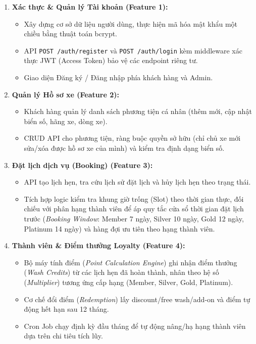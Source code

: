 \begin{enumerate}
    \item \textbf{Xác thực \& Quản lý Tài khoản (Feature 1):}
    \begin{itemize}
        \item Xây dựng cơ sở dữ liệu người dùng, thực hiện mã hóa mật khẩu một chiều bằng thuật toán bcrypt.
        \item API \texttt{POST /auth/register} và \texttt{POST /auth/login} kèm middleware xác thực JWT (Access Token) bảo vệ các endpoint riêng tư.
        \item Giao diện Đăng ký / Đăng nhập phía khách hàng và Admin.
    \end{itemize}

    \item \textbf{Quản lý Hồ sơ xe (Feature 2):}
    \begin{itemize}
        \item Khách hàng quản lý danh sách phương tiện cá nhân (thêm mới, cập nhật biển số, hãng xe, dòng xe).
        \item CRUD API cho phương tiện, ràng buộc quyền sở hữu (chỉ chủ xe mới sửa/xóa được hồ sơ xe của mình) và kiểm tra định dạng biển số.
    \end{itemize}

    \item \textbf{Đặt lịch dịch vụ (Booking) (Feature 3):}
    \begin{itemize}
        \item API tạo lịch hẹn, tra cứu lịch sử đặt lịch và hủy lịch hẹn theo trạng thái.
        \item Tích hợp logic kiểm tra khung giờ trống (Slot) theo thời gian thực, đối chiếu với phân hạng thành viên để áp quy tắc cửa sổ thời gian đặt lịch trước (\textit{Booking Window}: Member 7 ngày, Silver 10 ngày, Gold 12 ngày, Platinum 14 ngày) và hàng đợi ưu tiên theo hạng thành viên.
    \end{itemize}

    \item \textbf{Thành viên \& Điểm thưởng Loyalty (Feature 4):}
    \begin{itemize}
        \item Bộ máy tính điểm (\textit{Point Calculation Engine}) ghi nhận điểm thưởng (\textit{Wash Credits}) từ các lịch hẹn đã hoàn thành, nhân theo hệ số (\textit{Multiplier}) tương ứng cấp hạng (Member, Silver, Gold, Platinum).
        \item Cơ chế đổi điểm (\textit{Redemption}) lấy discount/free wash/add-on và điểm tự động hết hạn sau 12 tháng.
        \item Cron Job chạy định kỳ đầu tháng để tự động nâng/hạ hạng thành viên dựa trên chi tiêu tích lũy.
    \end{itemize}


\end{enumerate}
